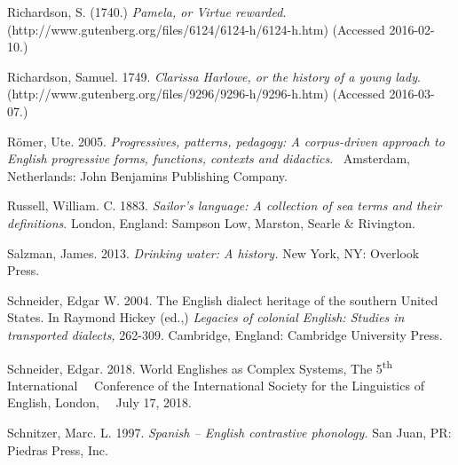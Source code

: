 \begin{styleStandard}
Richardson, S. (1740.) \textit{Pamela, or Virtue rewarded}. (http://www.gutenberg.org/files/6124/6124-h/6124-h.htm) (Accessed 2016-02-10.)
\end{styleStandard}

\begin{styleStandard}
Richardson, Samuel. 1749. \textit{Clarissa Harlowe, or the history of a young lady}. (http://www.gutenberg.org/files/9296/9296-h/9296-h.htm) (Accessed 2016-03-07.)
\end{styleStandard}

\begin{styleStandard}
Römer, Ute. 2005. \textit{Progressives, patterns, pedagogy: A corpus-driven approach to English progressive forms, functions, contexts and didactics}. \ Amsterdam, Netherlands: John Benjamins Publishing Company.
\end{styleStandard}

\begin{styleStandard}
Russell, William. C. 1883. \textit{Sailor’s language: A collection of sea terms and their definitions}. London, England: Sampson Low, Marston, Searle \& Rivington.
\end{styleStandard}

\begin{styleStandard}
Salzman, James. 2013. \textit{Drinking water: A history.} New York, NY: Overlook Press. 
\end{styleStandard}

\begin{styleStandard}
Schneider, Edgar W. 2004. The English dialect heritage of the southern United States. In Raymond Hickey (ed.,) \textit{Legacies of colonial English: Studies in transported dialects, }262-309. Cambridge, England: Cambridge University Press.
\end{styleStandard}

\begin{styleStandard}
Schneider, Edgar. 2018. World Englishes as Complex Systems, The 5\textsuperscript{th} International \ \ Conference of the International Society for the Linguistics of English, London, \ \ July 17, 2018. 
\end{styleStandard}

\begin{styleStandard}
Schnitzer, Marc. L. 1997. \textit{Spanish – English contrastive phonology. }San Juan, PR: Piedras Press, Inc.
\end{styleStandard}

